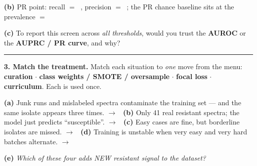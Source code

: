 \documentclass[11pt]{article}
\newif\ifsolution
\newcommand{\blk}[1]{\underline{\hspace{#1}}}
\newcommand{\rb}[2]{\ifsolution\textbf{#1}\else\blk{#2}\fi}
\newcommand{\keybox}[1]{\ifsolution\par\vspace{2pt}%
  \fbox{\parbox{0.965\textwidth}{\small\textbf{Answer.}\; #1}}\par\fi}
\newcommand{\work}[1]{\ifsolution\else\vspace{#1}\fi}
\begin{document}
\textbf{(b)} PR point: recall $=\ $ \rb{$0.80$}{2.0cm}, \; precision $=\ $ \rb{$0.33$}{2.0cm};\;
the PR chance baseline sits at the prevalence $=\ $ \rb{$20/500 = 0.04$}{2.8cm}
\work{0.3cm}

\textbf{(c)} To report this screen across \emph{all thresholds}, would you trust the \textbf{AUROC} or the
\textbf{AUPRC / PR curve}, and why?

\work{1.0cm}
\ifsolution\else\blk{\linewidth}\par\vspace{2pt}\blk{\linewidth}\fi

\keybox{(a) FPR $= 32/(32+448) = 32/480 = \mathbf{0.067}$; TPR $= \mathbf{0.80}$ --- the point $(0.067,\,0.80)$
\textbf{hugs the top-left}, so the ROC/AUROC \emph{looks excellent}. (b) PR point $=(\text{recall }\mathbf{0.80},\,
\text{precision }\mathbf{0.33})$; PR baseline $=$ prevalence $= 20/500 = \mathbf{0.04}$ (ROC's baseline is $0.5$).
(c) Trust the \textbf{AUPRC / PR curve} (reported with recall). At 4\% prevalence the 480 true-negatives dominate, so a
tiny FPR keeps AUROC flatteringly high even though precision is only \textbf{0.33} (2 of 3 flags false). AUROC is
invariant to the class ratio; AUPRC collapses toward the prevalence, so it stays honest as recall grows
(Saito \& Rehmsmeier 2015).}

\vspace{2pt}\hrule\vspace{5pt}

\textbf{3. Match the treatment.}\; {\small Match each situation to \emph{one} move from the menu:
\textbf{curation} \;$\cdot$\; \textbf{class weights / SMOTE / oversample} \;$\cdot$\; \textbf{focal loss}
\;$\cdot$\; \textbf{curriculum}. Each is used once.}

\vspace{2pt}
\textbf{(a)} Junk runs and mislabeled spectra contaminate the training set --- and the same isolate
appears three times. $\rightarrow$\ \rb{curation}{5cm}
\work{0.25cm}
\textbf{(b)} Only 41 real resistant spectra; the model just predicts ``susceptible''. $\rightarrow$\
\rb{class weights / SMOTE / oversample}{5cm}
\work{0.25cm}
\textbf{(c)} Easy cases are fine, but borderline isolates are missed. $\rightarrow$\ \rb{focal loss}{5cm}
\work{0.25cm}
\textbf{(d)} Training is unstable when very easy and very hard batches alternate. $\rightarrow$\
\rb{curriculum}{5cm}
\work{0.35cm}

\textbf{(e)} \emph{Which of these four adds NEW resistant signal to the dataset?}
\end{document}
